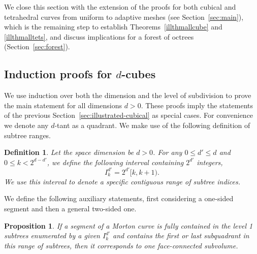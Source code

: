 \documentclass[a4paper,11pt]{article}
\newcommand{\Idk}{I^{d'}_k}
\newcommand{\eqnlab}[1]{\label{eqn:#1}}
\newcommand{\seclab}[1]{\label{sec:#1}}
\newcommand{\secref}[1]{Section~\ref{sec:#1}}
\newtheorem{prop}[thm]{Proposition}
\newtheorem{dfn}[thm]{Definition}
\begin{document}
We close this section with the extension of the proofs for both cubical and
tetrahedral curves from uniform to adaptive meshes (see \secref{main}), which
is the remaining step to establish Theorems~\ref{illthmallcube} and
\ref{illthmalltets},
and discuss implications for a forest of octrees (\secref{forest}).

\subsection{Induction proofs for $d$-cubes}
\seclab{illustrated-arbitrary}

We use induction over both the dimension and the level of subdivision to
prove the main statement for all dimensions $d > 0$.
These proofs imply the statements of the previous \secref{illustrated-cubical} as
special cases.  For convenience we denote any $d$-tant as a quadrant.  We make
use of the following definition of subtree ranges.
\begin{dfn}
  \label{defintervals}
  Let the space dimension be $d > 0$.  For any $0 \le d' \le d$ and $0 \le k <
  2^{d-d'}$, we define the following interval containing $2^{d'}$ integers,
  \begin{equation}
    \eqnlab{Idk}
    \Idk = 2^{d'} [ k, k + 1 ) .
  \end{equation}
We use this interval to denote a specific contiguous range of subtree
  indices.
\end{dfn}
We define the following auxiliary statements, first considering a one-sided
segment and then a general two-sided one.
\begin{prop}
  \label{arboneended}
  If a segment of a Morton curve is fully contained in the level 1 subtrees
  enumerated by a given $\Idk$ and contains the first or last subquadrant in
  this range of subtrees, then it corresponds to one face-connected subvolume.
\end{prop}
\end{document}
